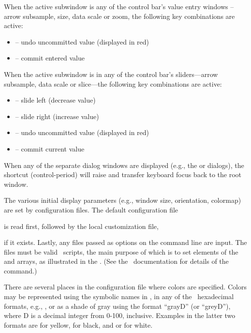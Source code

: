 When the active subwindow is any of the control bar's value entry
windows -- arrow subsample, size, data scale or zoom, the following key
combinations are active:
\begin{itemize}
\item {} -- undo uncommitted value (displayed in red)
\item {} -- commit entered value
\end{itemize}

When the active subwindow is in any of the control bar's sliders---arrow
subsample, data scale or slice---the following key combinations are
active:
\begin{itemize}
\item {} -- slide left (decrease value)
\item {} -- slide right (increase value)
\item {} -- undo uncommitted value (displayed in red)
\item {} -- commit current value
\end{itemize}

When any of the separate dialog windows are displayed (e.g., the
 or 
dialogs), the shortcut  (control-period) will raise and
transfer keyboard focus back to the root  window.

\label{sec:mmdispconfig}
The various initial display parameters (e.g., window size, orientation,
colormap) are set by configuration files.  The default configuration
file
\begin{quote}
\end{quote}
is read first, followed by the local customization file,
\begin{quote}
\end{quote}
if it exists.  Lastly, any files passed as  options on the
command line are input.  The files must be valid \Tcl\ scripts, the main
purpose of which is to set elements of the  and
 arrays, as illustrated in the .
(See the \Tcl\ documentation for details of the  command.)

There are several places in the configuration file where colors are
specified.  Colors may be represented using the symbolic names in
, in any of the \Tk\ hexadecimal
formats, e.g., , or as a shade of gray using the format
``grayD'' (or ``greyD''), where D is a decimal integer from 0-100,
inclusive.  Examples in the latter two formats are  for
yellow,  for black, and  or  for
white.

